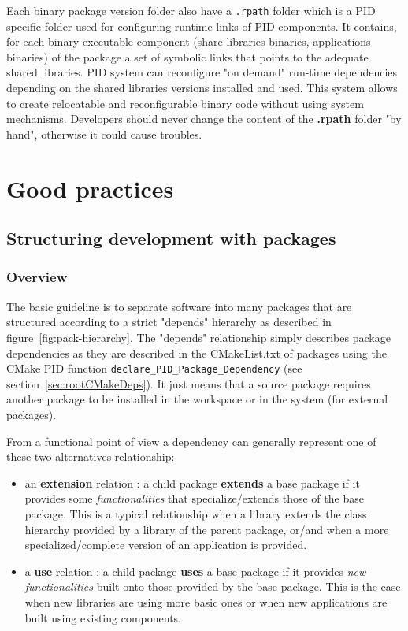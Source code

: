\documentclass[12pt,a4paper]{article}
\begin{document}
Each binary package version folder also have a \texttt{.rpath} folder which is a PID specific folder used for configuring runtime links of PID components. It contains, for each binary executable component (share libraries binaries, applications binaries) of the package a set of symbolic links that points to the adequate shared libraries. PID system can reconfigure "on demand" run-time dependencies depending on the shared libraries versions installed and used. This system allows to create relocatable and reconfigurable binary code without using system mechanisms. Developers should never change the content of the \textbf{.rpath} folder "by hand", otherwise it could cause troubles.

\pagebreak

\section{Good practices}

\subsection{Structuring development with packages}

\subsubsection{Overview}

The basic guideline is to separate software into many packages that are structured according to a strict "depends" hierarchy as described in figure~\ref{fig:pack-hierarchy}. The "depends" relationship simply describes package dependencies as they are described in the CMakeList.txt of packages using the CMake PID function \texttt{declare\_PID\_Package\_Dependency} (see section~\ref{sec:rootCMakeDeps}). It just means that a source package requires another package to be installed in the workspace or in the system (for external packages). 

From a functional point of view a dependency can generally represent one of these two alternatives relationship:
\begin{itemize}
\item an \textbf{extension} relation : a child package \textbf{extends} a base package if it provides some \textit{functionalities} that specialize/extends those of the base package. This is a typical relationship when a library extends the class hierarchy provided by a library of the parent package, or/and when a more specialized/complete version of an application is provided.
\item a \textbf{use} relation : a child package \textbf{uses} a base package if it provides \textit{new functionalities} built onto those provided by the base package. This is the case when new libraries are using more basic ones or when new applications are built using existing components.
\end{itemize}
\end{document}
